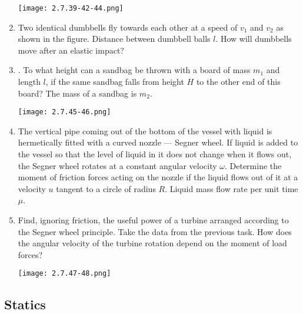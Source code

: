 \documentclass{article}
\begin{document}
\begin{enumerate}[label=2.7.\arabic*]
\begin{center}
    \texttt{[image: 2.7.39-42-44.png]}
\end{center}

\item Two identical dumbbells fly towards each other at a speed of $v_1$ and $v_2$ as shown in the figure. Distance between dumbbell balls $l$. How will dumbbells move after an elastic impact?

\item. To what height can a sandbag be thrown with a board of mass $m_1$ and length $l$, if the same sandbag falls from height $H$ to the other end of this board? The mass of a sandbag is $m_2$.

\begin{center}
    \texttt{[image: 2.7.45-46.png]}
\end{center}

\item The vertical pipe coming out of the bottom of the vessel with liquid is hermetically fitted with a curved nozzle — Segner wheel. If liquid is added to the vessel so that the level of liquid in it does not change when it flows out, the Segner wheel rotates at a constant angular velocity $\omega$. Determine the moment of friction forces acting on the nozzle if the liquid flows out of it at a velocity $u$ tangent to a circle of radius $R$. Liquid mass flow rate per unit time $\mu$.

\item Find, ignoring friction, the useful power of a turbine arranged according to the Segner wheel principle. Take the data from the previous task. How does the angular velocity of the turbine rotation depend on the moment of load forces?

\begin{center}
    \texttt{[image: 2.7.47-48.png]}
\end{center}


\end{enumerate}


\subsection{Statics}
\end{document}
